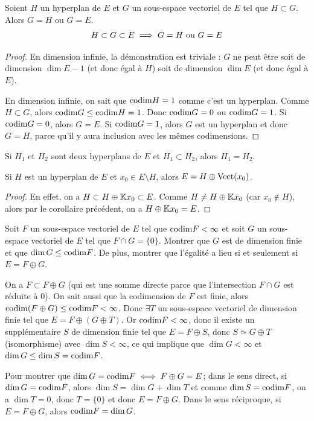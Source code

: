 \documentclass[11pt,a4paper]{report}
\begin{document}
\begin{consequence}
    Soient $H$ un hyperplan de $E$ et $G$ un sous-espace vectoriel de $E$ tel que $H \subset G$. Alors $G = H$ ou $G = E$.
    $$H \subset G \subset E \implies G = H \text{ ou } G = E$$
\end{consequence}

\begin{proof}
    En dimension infinie, la démonstration est triviale : $G$ ne peut être soit de dimension $\dim E - 1$ (et donc égal à $H$) soit de dimension $\dim E$ (et donc égal à $E$).

    En dimension infinie, on sait que $\mathrm{codim} H = 1$ comme c'est un hyperplan. Comme $H \subset G$, alors $\mathrm{codim} G \le \mathrm{codim} H = 1$. Donc $\mathrm{codim} G = 0$ ou $\mathrm{codim} G = 1$. Si $\mathrm{codim} G = 0$, alors $G = E$. Si $\mathrm{codim} G = 1$, alors $G$ est un hyperplan et donc $G = H$, parce qu'il y aura inclusion avec les mêmes codimensions.
\end{proof}

\begin{remark}
    Si $H_1$ et $H_2$ sont deux hyperplans de $E$ et $H_1 \subset H_2$, alors $H_1 = H_2$.
\end{remark}

\begin{remark}
    Si $H$ est un hyperplan de $E$ et $x_0 \in E\setminus H$, alors $E = H \oplus \mathrm{Vect}(x_0)$.
\end{remark}

\begin{proof}
    En effet, on a $H \subset H \oplus \mathbb{K} x_0 \subset E$. Comme $H \ne H \oplus \mathbb{K} x_0$ (car $x_0 \notin H$), alors par le corollaire précédent, on a $H \oplus \mathbb{K} x_0 = E$.
\end{proof}

\begin{exercise}
    Soit $F$ un sous-espace vectoriel de $E$ tel que $\mathrm{codim} F < \infty$ et soit $G$ un sous-espace vectoriel de $E$ tel que $F \cap G = \{0\}$. Montrer que $G$ est de dimension finie et que $\dim G \leq \mathrm{codim} F$. De plus, montrer que l'égalité a lieu si et seulement si $E = F \oplus G$.
\end{exercise}

\begin{correction}
    On a $F \subset F \oplus G$ (qui est une somme directe parce que l'intersection $F \cap G$ est réduite à 0). On sait aussi que la codimension de $F$ est finie, alors $\mathrm{codim} (F\oplus G) \le \mathrm{codim} F < \infty$. Donc $\exists T$ un sous-espace vectoriel de dimension finie tel que $E = F \oplus (G \oplus T)$. Or $\mathrm{codim} F < \infty$, donc il existe un supplémentaire $S$ de dimension finie tel que $E = F \oplus S$, donc $S \simeq G \oplus T$ (isomorphisme) avec $\dim S < \infty$, ce qui implique que $\dim G < \infty$ et $\dim G \le \dim S = \mathrm{codim} F$.

    Pour montrer que $\dim G = \mathrm{codim} F \iff F \oplus G = E$; dans le sens direct, si $\dim G = \mathrm{codim} F$, alors $\dim S = \dim G + \dim T$ et comme $\dim S = \mathrm{codim} F$, on a $\dim T = 0$, donc $T = \{0\}$ et donc $E = F \oplus G$. Dans le sens réciproque, si $E = F \oplus G$, alors $\mathrm{codim} F = \dim G$.
\end{correction}
\end{document}
